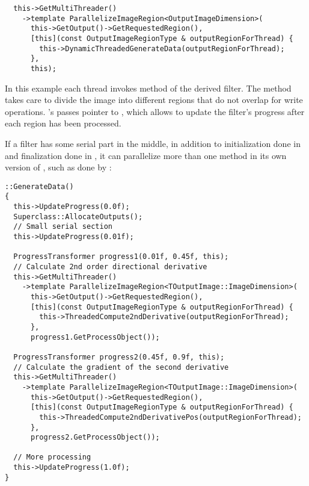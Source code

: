 \small
\begin{verbatim}
  this->GetMultiThreader()
    ->template ParallelizeImageRegion<OutputImageDimension>(
      this->GetOutput()->GetRequestedRegion(),
      [this](const OutputImageRegionType & outputRegionForThread) {
        this->DynamicThreadedGenerateData(outputRegionForThread);
      },
      this);
\end{verbatim}
\normalsize

In this example each thread invokes 
method of the derived filter. The 
method takes care to divide the image into different regions
that do not overlap for write operations.
's  passes  pointer
to , which allows 
to update the filter's progress after each region has been processed.

If a filter has some serial part in the middle, in addition to initialization
done in  and finalization done in
, it can parallelize more than one method
in its own version of , such as done by
:

\small
\begin{verbatim}
::GenerateData()
{
  this->UpdateProgress(0.0f);
  Superclass::AllocateOutputs();
  // Small serial section
  this->UpdateProgress(0.01f);

  ProgressTransformer progress1(0.01f, 0.45f, this);
  // Calculate 2nd order directional derivative
  this->GetMultiThreader()
    ->template ParallelizeImageRegion<TOutputImage::ImageDimension>(
      this->GetOutput()->GetRequestedRegion(),
      [this](const OutputImageRegionType & outputRegionForThread) {
        this->ThreadedCompute2ndDerivative(outputRegionForThread);
      },
      progress1.GetProcessObject());

  ProgressTransformer progress2(0.45f, 0.9f, this);
  // Calculate the gradient of the second derivative
  this->GetMultiThreader()
    ->template ParallelizeImageRegion<TOutputImage::ImageDimension>(
      this->GetOutput()->GetRequestedRegion(),
      [this](const OutputImageRegionType & outputRegionForThread) {
        this->ThreadedCompute2ndDerivativePos(outputRegionForThread);
      },
      progress2.GetProcessObject());

  // More processing
  this->UpdateProgress(1.0f);
}
\end{verbatim}
\normalsize

